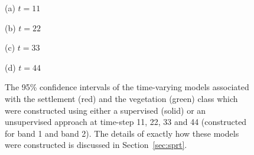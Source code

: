\documentclass{article}
\begin{document}
\begin{figure}[h!]
\begin{minipage}[b]{.47\linewidth}
  \centering 
  \centerline{}
  \centerline{(a) $t=11$}\medskip
\end{minipage}
\hfill
\begin{minipage}[b]{0.47\linewidth}
  \centering
  \centerline{}
  \centerline{(b) $t=22$}\medskip
\end{minipage}

\begin{minipage}[b]{.47\linewidth}
  \centering 
  \centerline{}
  \centerline{(c) $t=33$}\medskip
\end{minipage}
\hfill
\begin{minipage}[b]{0.47\linewidth}
  \centering
  \centerline{}
  \centerline{(d) $t=44$}\medskip
\end{minipage}
\caption{The 95\% confidence intervals of the time-varying models associated with the settlement (red) and the vegetation (green) class which were constructed using either a supervised (solid) or an unsupervised approach at time-step 11, 22, 33 and 44 (constructed 
for band 1 and band 2). The details of exactly how these models were constructed is discussed in Section~\ref{sec:sprt}.}
\label{fig:time_vary_model}
\end{figure}
\end{document}
